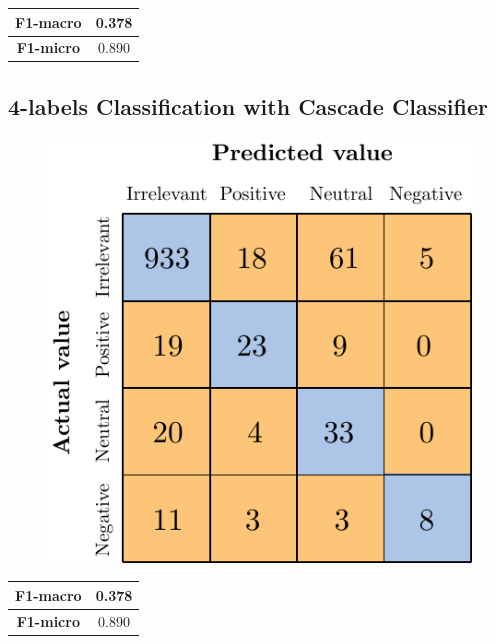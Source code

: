 \begin{center}
	\begin{tabular}{ | c | c | } 
		\hline
		\textbf{F1-macro} & 0.378 \\
		\hline
		\textbf{F1-micro} & 0.890 \\ 
		\hline
	\end{tabular}
\end{center}


\subsection{4-labels Classification with Cascade Classifier}

\begin{figure}[H]
	\centering
	\includegraphics[scale=1]{figures/conf_matrices/ita_cascade_bpef/ita_cascade_bpef_val.pdf}
	\label{fig:ita_cascade_svm_val}
\end{figure}

\begin{center}
	\begin{tabular}{ | c | c | } 
		\hline
		\textbf{F1-macro} & 0.378 \\
		\hline
		\textbf{F1-micro} & 0.890 \\ 
		\hline
	\end{tabular}
\end{center}


